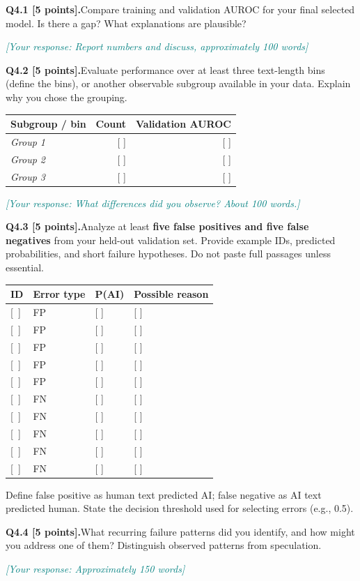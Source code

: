 \documentclass[11pt,letterpaper]{article}
\newcommand{\placeholder}[1]{\par\noindent\textcolor{teal}{\textit{[Your response: #1]}}\par\vspace{0.3em}}
\newcommand{\question}[2]{\needspace{4\baselineskip}\par\addvspace{0.45em}\noindent\textbf{#1}\quad #2\par\nobreak\vspace{0.1em}}
\newcommand{\smallnote}[1]{{\small\color{muted}#1}}
\begin{document}
\question{Q4.1 [5 points].}{Compare training and validation AUROC for your final selected model. Is there a gap? What explanations are plausible?}
\placeholder{Report numbers and discuss, approximately 100 words}
\question{Q4.2 [5 points].}{Evaluate performance over at least three text-length bins (define the bins), or another observable subgroup available in your data. Explain why you chose the grouping.}
\begin{tabularx}{\linewidth}{@{}Yrr@{}}\toprule Subgroup / bin & Count & Validation AUROC \\ \midrule \textit{Group 1} & [ ] & [ ] \\ \textit{Group 2} & [ ] & [ ] \\ \textit{Group 3} & [ ] & [ ] \\ \bottomrule\end{tabularx}
\placeholder{What differences did you observe? About 100 words.}
\question{Q4.3 [5 points].}{Analyze at least \textbf{five false positives and five false negatives} from your held-out validation set. Provide example IDs, predicted probabilities, and short failure hypotheses. Do not paste full passages unless essential.}
\begin{tabularx}{\linewidth}{@{}p{0.64in}p{0.70in}p{0.98in}Y@{}}\toprule ID & Error type & P(AI) & Possible reason \\ \midrule
\mbox{[ ]} & FP & [ ] & [ ] \\
\mbox{[ ]} & FP & [ ] & [ ] \\
\mbox{[ ]} & FP & [ ] & [ ] \\
\mbox{[ ]} & FP & [ ] & [ ] \\
\mbox{[ ]} & FP & [ ] & [ ] \\
\mbox{[ ]} & FN & [ ] & [ ] \\
\mbox{[ ]} & FN & [ ] & [ ] \\
\mbox{[ ]} & FN & [ ] & [ ] \\
\mbox{[ ]} & FN & [ ] & [ ] \\
\mbox{[ ]} & FN & [ ] & [ ] \\
\bottomrule\end{tabularx}
\smallnote{Define false positive as human text predicted AI; false negative as AI text predicted human. State the decision threshold used for selecting errors (e.g., 0.5).}
\question{Q4.4 [5 points].}{What recurring failure patterns did you identify, and how might you address one of them? Distinguish observed patterns from speculation.}
\placeholder{Approximately 150 words}

\newpage
\end{document}
